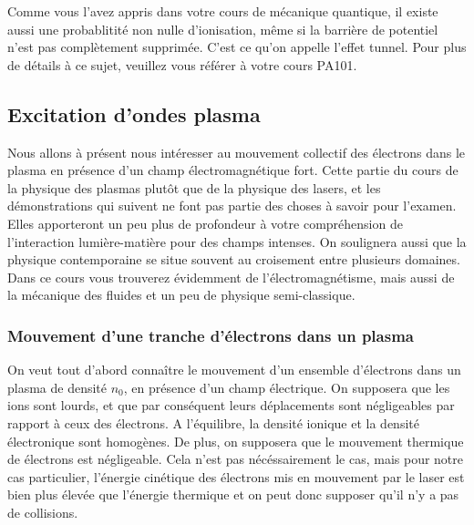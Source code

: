 \documentclass[a4paper]{book}
\begin{document}
\medskip

\noindent{}\hfill
    
\medskip

Comme vous l'avez appris dans votre cours de mécanique quantique, il existe aussi une probablitité non nulle d'ionisation, même si la barrière de potentiel n'est pas complètement supprimée. C'est ce qu'on appelle l'effet tunnel. Pour plus de détails à ce sujet, veuillez vous référer à votre cours PA101.

\subsection{Excitation d'ondes plasma}

Nous allons à présent nous intéresser au mouvement collectif des électrons dans le plasma en présence d'un champ électromagnétique fort. Cette partie du cours de la physique des plasmas plutôt que de la physique des lasers, et les démonstrations qui suivent ne font pas partie des choses à savoir pour l'examen. Elles apporteront un peu plus de profondeur à votre compréhension de l'interaction lumière-matière pour des champs intenses. On soulignera aussi que la physique contemporaine se situe souvent au croisement entre plusieurs domaines. Dans ce cours vous trouverez évidemment de l'électromagnétisme, mais aussi de la mécanique des fluides et un peu de physique semi-classique.

\subsubsection{Mouvement d'une tranche d'électrons dans un plasma}

On veut tout d'abord connaître le mouvement d'un ensemble d'électrons dans un plasma de densité $n_0$, en présence d'un champ électrique. On supposera que les ions sont lourds, et que par conséquent leurs déplacements sont négligeables par rapport à ceux des électrons. A l'équilibre, la densité ionique et la densité électronique sont homogènes. De plus, on supposera que le mouvement thermique de électrons est négligeable. Cela n'est pas nécéssairement le cas, mais pour notre cas particulier, l'énergie cinétique des électrons mis en mouvement par le laser est bien plus élevée que l'énergie thermique et on peut donc supposer qu'il n'y a pas de collisions. 
\end{document}
